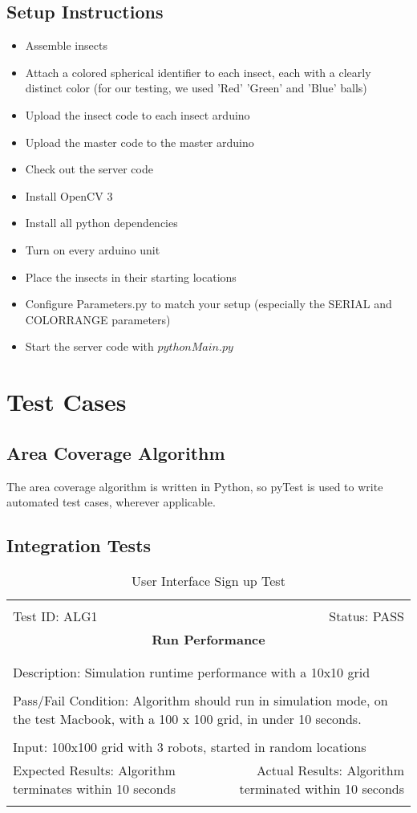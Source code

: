 \documentclass[11pt]{article}
\newcommand{\testcase}[8]{
\begin{center}
\begin{table}[H]
\begin{tabular}{|l r|}\hline&\\[-2mm]
	Test ID: {#1}	&Status: {#2} \\[-3mm]
	\multicolumn{2}{|c|}{\textbf{\large{{#3}}}}\\&\\\hline&\\[-3mm]
	\multicolumn{2}{|p{\textwidth}|}{Description: {#4}}\\[1mm]\hline&\\[-3mm]
	\multicolumn{2}{|p{\textwidth}|}{Pass/Fail Condition: {#5}}\\[1mm]\hline&\\[-3mm]
	\multicolumn{2}{|p{\textwidth}|}{Input: {#6}}\\[2mm]\hline
	\multicolumn{1}{|p{0.49\textwidth}}{Expected Results: {#7}}	&
    \multicolumn{1}{|p{0.45\textwidth}|}{Actual Results: {#8}}\\\hline&\\[-3mm]
\end{tabular}
\caption{User Interface Sign up Test}
\end{table}
\end{center}
}
\begin{document}
\subsection{Setup Instructions}
\begin{itemize}
\item Assemble insects
\item Attach a colored spherical identifier to each insect, each with a clearly distinct color (for our testing, we used 'Red' 'Green' and 'Blue' balls)
\item Upload the insect code to each insect arduino
\item Upload the master code to the master arduino
\item Check out the server code
\item Install OpenCV 3
\item Install all python dependencies
\item Turn on every arduino unit
\item Place the insects in their starting locations
\item Configure Parameters.py to match your setup (especially the SERIAL and COLORRANGE parameters)
\item Start the server code with $python Main.py$
\end{itemize}

\section{Test Cases}


\subsection{Area Coverage Algorithm}

The area coverage algorithm is written in Python, so pyTest is used to write automated test
cases, wherever applicable.

\subsection{Integration Tests}


\testcase
{ALG1}
{PASS}
{Run Performance}
{Simulation runtime performance with a 10x10 grid}
{Algorithm should run in simulation mode, on the test Macbook,
with a 100 x 100 grid, in under 10 seconds.}
{100x100 grid with 3 robots, started in random locations}
{Algorithm terminates within 10 seconds}
{Algorithm terminated within 10 seconds}
\end{document}
